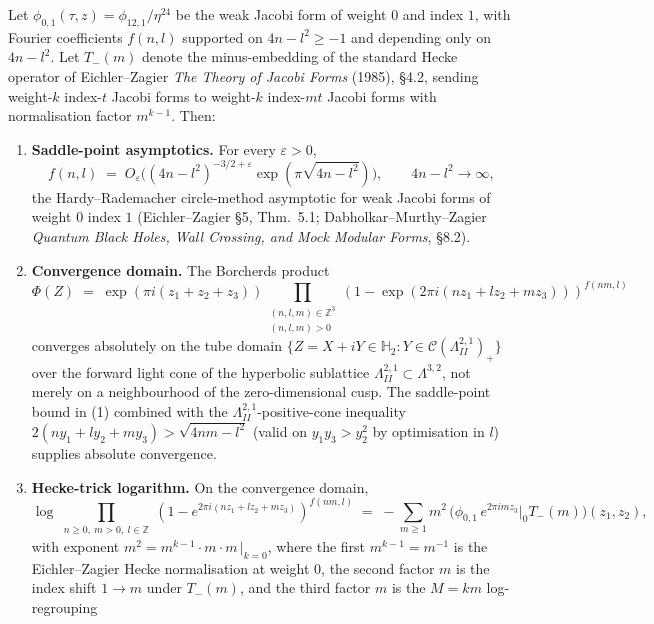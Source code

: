 \begin{lemma}[Saddle-point asymptotics and Hecke-trick normalisation for \texorpdfstring{$\Phi_1 = \Delta_5$}{Phi-1 = Delta-5}]
\label{lem:delta5-saddle-point-hecke-normalisation}
Let $\phi_{0,1}(\tau, z) = \phi_{12,1}/\eta^{24}$ be the weak Jacobi form
of weight $0$ and index $1$, with Fourier coefficients $f(n,l)$
supported on $4n - l^2 \geq -1$ and depending only on $4n - l^2$. Let
$T_-(m)$ denote the minus-embedding of the standard Hecke operator of
Eichler--Zagier \emph{The Theory of Jacobi Forms} (1985), \S4.2, sending
weight-$k$ index-$t$ Jacobi forms to weight-$k$ index-$mt$ Jacobi forms
with normalisation factor $m^{k-1}$. Then:
\begin{enumerate}
\item \textbf{Saddle-point asymptotics.} For every $\varepsilon > 0$,
\[
 f(n, l) \;=\; O_\varepsilon\!\bigl((4n - l^2)^{-3/2 + \varepsilon}
 \exp(\pi\sqrt{4n - l^2})\bigr), \qquad 4n - l^2 \to \infty,
\]
the Hardy--Rademacher circle-method asymptotic for weak Jacobi forms
of weight $0$ index $1$ (Eichler--Zagier \S5, Thm.~5.1;
Dabholkar--Murthy--Zagier \emph{Quantum Black Holes, Wall Crossing, and
Mock Modular Forms}, \S8.2).
\item \textbf{Convergence domain.} The Borcherds product
\[
 \Phi(Z) \;=\; \exp(\pi i(z_1 + z_2 + z_3))
 \prod_{\substack{(n, l, m) \in \mathbb{Z}^3 \\ (n,l,m) > 0}}
 (1 - \exp(2\pi i(nz_1 + lz_2 + mz_3)))^{f(nm, l)}
\]
converges absolutely on the tube domain
$\{Z = X + iY \in \mathbb{H}_2 : Y \in \mathcal{C}(\Lambda^{2,1}_{II})_+\}$
over the forward light cone of the hyperbolic sublattice
$\Lambda^{2,1}_{II} \subset \Lambda^{3,2}$, not merely on a
neighbourhood of the zero-dimensional cusp. The saddle-point bound in
(1) combined with the $\Lambda^{2,1}_{II}$-positive-cone inequality
$2(ny_1 + ly_2 + my_3) > \sqrt{4nm - l^2}$ (valid on $y_1 y_3 > y_2^2$
by optimisation in $l$) supplies absolute convergence.
\item \textbf{Hecke-trick logarithm.} On the convergence domain,
\[
 \log \prod_{\substack{n \geq 0,\ m > 0,\ l \in \mathbb{Z}}}
 (1 - e^{2\pi i(nz_1 + lz_2 + mz_3)})^{f(nm, l)}
 \;=\; -\sum_{m \geq 1} m^2\,
 \bigl(\phi_{0,1}\, e^{2\pi i m z_3}\big|_0 T_-(m)\bigr)(z_1, z_2),
\]
with exponent $m^2 = m^{k-1}\cdot m \cdot m \,|_{k=0}$, where the first
$m^{k-1} = m^{-1}$ is the Eichler--Zagier Hecke normalisation at
weight $0$, the second factor $m$ is the index shift $1 \to m$ under
$T_-(m)$, and the third factor $m$ is the $M = km$ log-regrouping

\end{enumerate}
\end{lemma}
